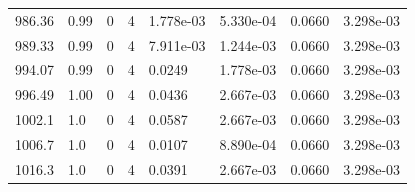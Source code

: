 \documentclass[preview]{standalone}
\begin{document}
{{{{{{\begin{tabular}{L{1.2cm}C{1.2cm} C{0.3cm}C{0.5cm} C{1.4cm}C{1.4cm} C{1.4cm}C{1.4cm}}
  986.36  &  0.99  & 0     &  4 &  1.778e-03  & 5.330e-04  & 0.0660 &  3.298e-03   \\ 
  989.33  &  0.99  & 0     &  4 &  7.911e-03  & 1.244e-03  & 0.0660 &  3.298e-03   \\ 
  994.07  &  0.99  & 0     &  4 &  0.0249  & 1.778e-03  & 0.0660 &  3.298e-03   \\ 
  996.49  &  1.00  & 0     &  4 &  0.0436  & 2.667e-03  & 0.0660 &  3.298e-03   \\ 
  1002.1  &   1.0  & 0     &  4 &  0.0587  & 2.667e-03  & 0.0660 &  3.298e-03   \\ 
  1006.7  &   1.0  & 0     &  4 &  0.0107  & 8.890e-04  & 0.0660 &  3.298e-03   \\ 
  1016.3  &   1.0  & 0     &  4 &  0.0391  & 2.667e-03  & 0.0660 &  3.298e-03   \\ 
\hline 
\end{tabular} 

}}}}}}
\end{document}
